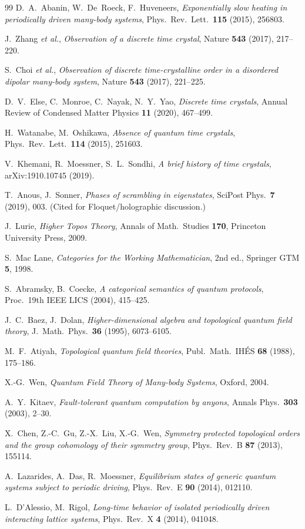 \documentclass[12pt]{article}
\theoremstyle{definition}
\theoremstyle{remark}
\begin{document}
\begin{thebibliography}{99}
D.~A.~Abanin, W.~De~Roeck, F.~Huveneers,
\emph{Exponentially slow heating in periodically driven many-body systems},
Phys.\ Rev.\ Lett.\ \textbf{115} (2015), 256803.

J.~Zhang \emph{et al.},
\emph{Observation of a discrete time crystal},
Nature \textbf{543} (2017), 217--220.

S.~Choi \emph{et al.},
\emph{Observation of discrete time-crystalline order in a disordered dipolar many-body system},
Nature \textbf{543} (2017), 221--225.

D.~V.~Else, C.~Monroe, C.~Nayak, N.~Y.~Yao,
\emph{Discrete time crystals},
Annual Review of Condensed Matter Physics \textbf{11} (2020), 467--499.

H.~Watanabe, M.~Oshikawa,
\emph{Absence of quantum time crystals},
Phys.\ Rev.\ Lett.\ \textbf{114} (2015), 251603.

V.~Khemani, R.~Moessner, S.~L.~Sondhi,
\emph{A brief history of time crystals},
arXiv:1910.10745 (2019).

T.~Anous, J.~Sonner,
\emph{Phases of scrambling in eigenstates},
SciPost Phys.\ \textbf{7} (2019), 003. (Cited for Floquet/holographic discussion.)

J.~Lurie,
\emph{Higher Topos Theory},
Annals of Math.\ Studies \textbf{170}, Princeton University Press, 2009.

S.~Mac Lane,
\emph{Categories for the Working Mathematician}, 2nd ed.,
Springer GTM \textbf{5}, 1998.

S.~Abramsky, B.~Coecke,
\emph{A categorical semantics of quantum protocols},
Proc.\ 19th IEEE LICS (2004), 415--425.

J.~C.~Baez, J.~Dolan,
\emph{Higher-dimensional algebra and topological quantum field theory},
J.\ Math.\ Phys.\ \textbf{36} (1995), 6073--6105.

M.~F.~Atiyah,
\emph{Topological quantum field theories},
Publ.\ Math.\ IH\'ES \textbf{68} (1988), 175--186.

X.-G.~Wen,
\emph{Quantum Field Theory of Many-body Systems}, Oxford, 2004.

A.~Y.~Kitaev,
\emph{Fault-tolerant quantum computation by anyons},
Annals Phys.\ \textbf{303} (2003), 2--30.

X.~Chen, Z.-C.~Gu, Z.-X.~Liu, X.-G.~Wen,
\emph{Symmetry protected topological orders and the group cohomology of their symmetry group},
Phys.\ Rev.\ B \textbf{87} (2013), 155114.

A.~Lazarides, A.~Das, R.~Moessner,
\emph{Equilibrium states of generic quantum systems subject to periodic driving},
Phys.\ Rev.\ E \textbf{90} (2014), 012110.

L.~D'Alessio, M.~Rigol,
\emph{Long-time behavior of isolated periodically driven interacting lattice systems},
Phys.\ Rev.\ X \textbf{4} (2014), 041048.

\end{thebibliography}
\end{document}
